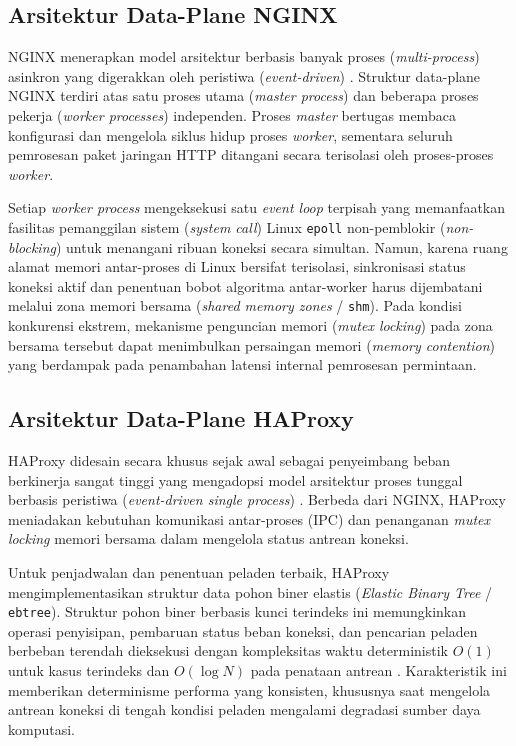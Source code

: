 \subsection{Arsitektur Data-Plane NGINX}
NGINX menerapkan model arsitektur berbasis banyak proses (\textit{multi-process}) asinkron yang digerakkan oleh peristiwa (\textit{event-driven}) \citep{faridah2026performance}. Struktur data-plane NGINX terdiri atas satu proses utama (\textit{master process}) dan beberapa proses pekerja (\textit{worker processes}) independen. Proses \textit{master} bertugas membaca konfigurasi dan mengelola siklus hidup proses \textit{worker}, sementara seluruh pemrosesan paket jaringan HTTP ditangani secara terisolasi oleh proses-proses \textit{worker}.

Setiap \textit{worker process} mengeksekusi satu \textit{event loop} terpisah yang memanfaatkan fasilitas pemanggilan sistem (\textit{system call}) Linux \texttt{epoll} non-pemblokir (\textit{non-blocking}) untuk menangani ribuan koneksi secara simultan. Namun, karena ruang alamat memori antar-proses di Linux bersifat terisolasi, sinkronisasi status koneksi aktif dan penentuan bobot algoritma antar-worker harus dijembatani melalui zona memori bersama (\textit{shared memory zones} / \texttt{shm}). Pada kondisi konkurensi ekstrem, mekanisme penguncian memori (\textit{mutex locking}) pada zona bersama tersebut dapat menimbulkan persaingan memori (\textit{memory contention}) yang berdampak pada penambahan latensi internal pemrosesan permintaan.

\subsection{Arsitektur Data-Plane HAProxy}
HAProxy didesain secara khusus sejak awal sebagai penyeimbang beban berkinerja sangat tinggi yang mengadopsi model arsitektur proses tunggal berbasis peristiwa (\textit{event-driven single process}) \citep{tarreau2024haproxy}. Berbeda dari NGINX, HAProxy meniadakan kebutuhan komunikasi antar-proses (IPC) dan penanganan \textit{mutex locking} memori bersama dalam mengelola status antrean koneksi.

Untuk penjadwalan dan penentuan peladen terbaik, HAProxy mengimplementasikan struktur data pohon biner elastis (\textit{Elastic Binary Tree} / \texttt{ebtree}). Struktur pohon biner berbasis kunci terindeks ini memungkinkan operasi penyisipan, pembaruan status beban koneksi, dan pencarian peladen berbeban terendah dieksekusi dengan kompleksitas waktu deterministik $O(1)$ untuk kasus terindeks dan $O(\log N)$ pada penataan antrean \citep{rawls2022load}. Karakteristik ini memberikan determinisme performa yang konsisten, khususnya saat mengelola antrean koneksi di tengah kondisi peladen mengalami degradasi sumber daya komputasi.

